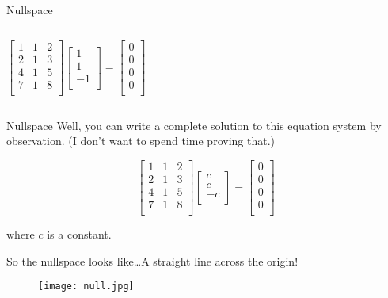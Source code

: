 \documentclass{beamer}
\begin{document}
\begin{frame}{Nullspace}
\begin{columns}
    \begin{equation*}
        \left[ \begin{matrix}
            1&		1&		2\\
            2&		1&		3\\
            4&		1&		5\\
            7&		1&		8\\
        \end{matrix} \right] \left[ \begin{array}{c}
            1\\
            1\\
            -1\\
        \end{array} \right] =\left[ \begin{array}{c}
            0\\
            0\\
            0\\
            0\\
        \end{array} \right]
    \end{equation*}
\end{columns}
\end{frame}

\begin{frame}{Nullspace}
Well, you can write a complete solution to this equation system by observation. (I don't want to spend time proving that.)

\begin{equation*}
    \left[ \begin{matrix}
        1&		1&		2\\
        2&		1&		3\\
        4&		1&		5\\
        7&		1&		8\\
    \end{matrix} \right] \left[ \begin{array}{c}
        c\\
        c\\
        -c\\
    \end{array} \right] =\left[ \begin{array}{c}
        0\\
        0\\
        0\\
        0\\
    \end{array} \right]
\end{equation*}

where $c$ is a constant.

\vspace{3pt}
So the nullspace looks like\dots \:A straight line across the origin!

\begin{figure}
    \centering
    \texttt{[image: null.jpg]}
\end{figure}
\end{frame}
\end{document}
